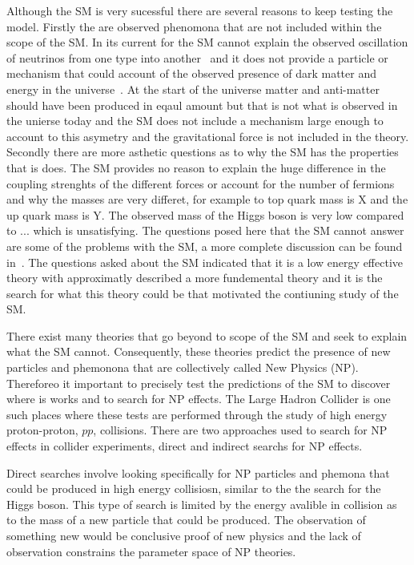 Although the SM is very sucessful there are several reasons to keep testing the model. Firstly the are observed phenomona that are not included within the scope of the SM. %
In its current for the SM cannot explain the observed oscillation of neutrinos from one type into another~\cite{} and it does not provide a particle or mechanism that could account of the observed presence of dark matter and energy in the universe~\cite{}. At the start of the universe matter and anti-matter should have been produced in eqaul amount but that is not what is observed in the unierse today and the SM does not include a mechanism large enough to account to this asymetry and the gravitational force is not included in the theory.
Secondly there are more asthetic questions as to why the SM has the properties that is does. 
The SM provides no reason to explain the huge difference in the coupling strenghts of the different forces or account for the number of fermions and why the masses are very differet, for example to top quark mass is X and the up quark mass is Y. The observed mass of the Higgs boson is very low compared to ... which is unsatisfying. 
The questions posed here that the SM cannot answer are some of the problems with the SM, a more complete discussion can be found in~\cite{}. 
The questions asked about the SM indicated that it is a low energy effective theory with approximatly described a more fundemental theory and it is the search for what this theory could be that motivated the contiuning study of the SM. 

There exist many theories that go beyond to scope of the SM and seek to explain what the SM cannot. Consequently, these theories predict the presence of new particles and phemonona that are collectively called New Physics (NP). 
Thereforeo it important to precisely test the predictions of the SM to discover where is works and to search for NP effects. The Large Hadron Collider is one such places where these tests are performed through the study of high energy proton-proton, $pp$, collisions. There are two approaches used to search for NP effects in collider experiments, direct and indirect searchs for NP effects.

Direct searches involve looking specifically for NP particles and phemona that could be produced in high energy collisiosn, similar to the the search for the Higgs boson. This type of search is limited by the energy avalible in collision as to the mass of a new particle that could be produced. The observation of something new would be conclusive proof of new physics and the lack of observation constrains the parameter space of NP theories.

